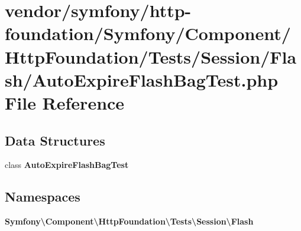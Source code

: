 \section{vendor/symfony/http-\/foundation/\+Symfony/\+Component/\+Http\+Foundation/\+Tests/\+Session/\+Flash/\+Auto\+Expire\+Flash\+Bag\+Test.php File Reference}
\label{_auto_expire_flash_bag_test_8php}
\subsection*{Data Structures}
\begin{DoxyCompactItemize}
\item 
class {\bf Auto\+Expire\+Flash\+Bag\+Test}
\end{DoxyCompactItemize}
\subsection*{Namespaces}
\begin{DoxyCompactItemize}
\item 
 {\bf Symfony\textbackslash{}\+Component\textbackslash{}\+Http\+Foundation\textbackslash{}\+Tests\textbackslash{}\+Session\textbackslash{}\+Flash}
\end{DoxyCompactItemize}
